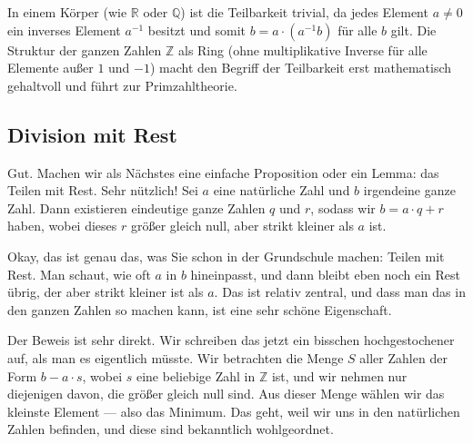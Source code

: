 \begin{didactic-insight}
In einem Körper (wie $\mathbb{R}$ oder $\mathbb{Q}$) ist die Teilbarkeit trivial, da jedes Element $a \neq 0$ ein inverses Element $a^{-1}$ besitzt und somit $b = a \cdot (a^{-1}b)$ für alle $b$ gilt. Die Struktur der ganzen Zahlen $\mathbb{Z}$ als Ring (ohne multiplikative Inverse für alle Elemente außer $1$ und $-1$) macht den Begriff der Teilbarkeit erst mathematisch gehaltvoll und führt zur Primzahltheorie.
\end{didactic-insight}

\subsection{Division mit Rest}

\begin{spoken-clean}[00:07:10 - 00:08:30]
Gut. Machen wir als Nächstes eine einfache Proposition oder ein Lemma: das Teilen mit Rest. Sehr nützlich! Sei $a$ eine natürliche Zahl und $b$ irgendeine ganze Zahl. Dann existieren eindeutige ganze Zahlen $q$ und $r$, sodass wir $b = a \cdot q + r$ haben, wobei dieses $r$ größer gleich null, aber strikt kleiner als $a$ ist.

Okay, das ist genau das, was Sie schon in der Grundschule machen: Teilen mit Rest. Man schaut, wie oft $a$ in $b$ hineinpasst, und dann bleibt eben noch ein Rest übrig, der aber strikt kleiner ist als $a$. Das ist relativ zentral, und dass man das in den ganzen Zahlen so machen kann, ist eine sehr schöne Eigenschaft.

Der Beweis ist sehr direkt. Wir schreiben das jetzt ein bisschen hochgestochener auf, als man es eigentlich müsste. Wir betrachten die Menge $S$ aller Zahlen der Form $b - a \cdot s$, wobei $s$ eine beliebige Zahl in $\mathbb{Z}$ ist, und wir nehmen nur diejenigen davon, die größer gleich null sind. Aus dieser Menge wählen wir das kleinste Element --- also das Minimum. Das geht, weil wir uns in den natürlichen Zahlen befinden, und diese sind bekanntlich wohlgeordnet.
\end{spoken-clean}

\begin{math-stroke}
\end{math-stroke}

